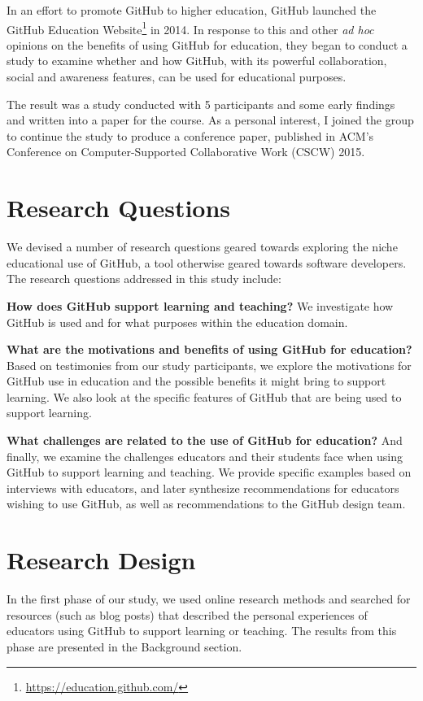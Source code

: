 In an effort to promote GitHub to higher education, GitHub launched the GitHub Education Website\footnote{\url{https://education.github.com/}} in 2014.
In response to this and other \textit{ad hoc} opinions on the benefits of using GitHub for education, they began to conduct a study to examine whether and how GitHub, with its powerful collaboration, social and awareness features, can be used for educational purposes.

The result was a study conducted with 5 participants and some early findings and written into a paper for the course. As a personal interest, I joined the group to continue the study to produce a conference paper, published in ACM's Conference on Computer-Supported Collaborative Work (CSCW) 2015.

\section{Research Questions}
We devised a number of research questions geared towards exploring the niche educational use of GitHub, a tool otherwise geared towards software developers. The research questions addressed in this study include:

\textbf{How does GitHub support learning and teaching?} We investigate how GitHub is used and for what purposes within the education domain. %

\textbf{What are the motivations and benefits of using GitHub for education?} Based on testimonies from our study participants, we explore the motivations for GitHub use in education and the possible benefits it might bring to support learning. We also look at the specific features of GitHub that are being used to support learning.

\textbf{What challenges are related to the use of GitHub for education?} And finally, we examine the challenges educators and their students face when using GitHub to support learning and teaching. We provide specific examples based on interviews with educators, and later synthesize recommendations for educators wishing to use GitHub, as well as recommendations to the GitHub design team.

\section{Research Design}
In the first phase of our study, we used online research methods \cite{wakeford2008fieldnotes} and searched for resources (such as blog posts) that described the personal experiences of educators using GitHub to support learning or teaching. The results from this phase are presented in the Background section.

